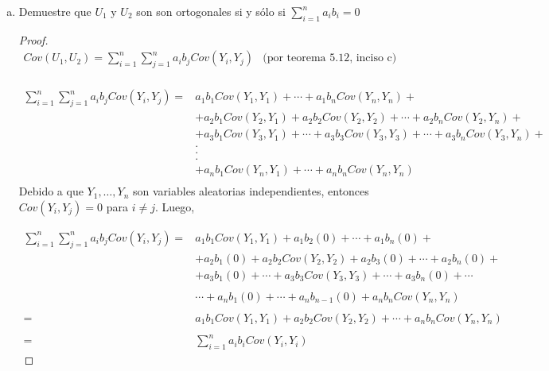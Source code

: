 \documentclass[a4paper,12pt]{article}
\begin{document}
\begin{enumerate}[a)]
    \item Demuestre que $U_1$ y $U_2$ son son ortogonales si y sólo si $\sum_{i=1}^n a_ib_i = 0$

        \begin{proof}
            \[
            \begin{array}{rll}
                Cov(U_1,U_2) = \sum_{i=1}^n \sum_{j=1}^n a_ib_jCov(Y_i,Y_j) & \text{(por teorema 5.12, inciso c)}    \\
                 & 
            \end{array}
            \]
            
            \[
            \begin{array}{rc}
                \sum_{i=1}^n \sum_{j=1}^n a_ib_jCov(Y_i,Y_j) =& a_1b_1Cov(Y_1,Y_1) + \cdots + a_1b_nCov(Y_n,Y_n) +  \\
                 & + a_2b_1Cov(Y_2,Y_1) + a_2b_2Cov(Y_2,Y_2) + \cdots + a_2b_nCov(Y_2,Y_n) + \\
                 & + a_3b_1Cov(Y_3,Y_1) + \cdots + a_3b_3Cov(Y_3,Y_3) + \cdots + a_3b_nCov(Y_3,Y_n)+\\
                 & .\\
                 & .\\
                 & .\\
                 & + a_nb_1Cov(Y_n,Y_1) + \cdots + a_nb_nCov(Y_n,Y_n)\\
            \end{array}
            \]
            Debido a que $Y_1,\dots,Y_n$ son variables aleatorias independientes, entonces $Cov(Y_i,Y_j) = 0$ para $i\not = j$. Luego,
            
            \[
            \begin{array}{rl}
                \sum_{i=1}^n \sum_{j=1}^n a_ib_jCov(Y_i,Y_j) =& a_1b_1Cov(Y_1,Y_1) +a_1b_2(0)+ \cdots + a_1b_n(0) +  \\
                 & + a_2b_1(0) + a_2b_2Cov(Y_2,Y_2) + a_2b_3(0) + \cdots + a_2b_n(0) + \\
                 & + a_3b_1(0) + \cdots + a_3b_3Cov(Y_3,Y_3) + \cdots + a_3b_n(0)+\cdots\\\\
                 &\cdots + a_nb_1(0) + \cdots +a_nb_{n-1}(0)+ a_nb_nCov(Y_n,Y_n)\\\\
                 = & a_1b_1Cov(Y_1,Y_1) + a_2b_2Cov(Y_2,Y_2) + \cdots + a_nb_nCov(Y_n,Y_n)\\\\
                 = & \sum_{i=1}^n a_ib_i Cov(Y_i,Y_i)
            \end{array}
            \]
            

\end{proof}
\end{enumerate}
\end{document}
